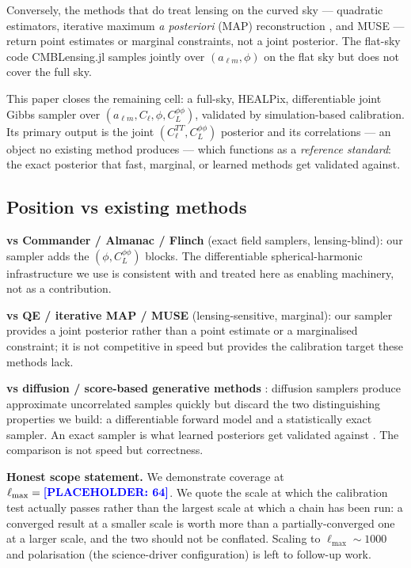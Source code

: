 \documentclass[twocolumn,superscriptaddress,aps,prl,floatfix]{revtex4-2}
\newcommand{\alm}{a_{\ell m}}
\newcommand{\cl}{C_\ell}
\newcommand{\clpp}{C_L^{\phi\phi}}
\newcommand{\lmax}{\ell_{\max}}
\newcommand{\placeholder}[1]{\textcolor{blue}{\textbf{[PLACEHOLDER: #1]}}}
\begin{document}
Conversely, the methods that do treat lensing on the curved sky — quadratic
estimators, iterative maximum \textit{a posteriori} (MAP) reconstruction
\citep{Carron:2017}, and MUSE \citep{MUSE} — return point estimates or marginal
constraints, not a joint posterior.
The flat-sky code CMBLensing.jl \citep{CMBLensing} samples jointly over
$(\alm, \phi)$ on the flat sky but does not cover the full sky.

This paper closes the remaining cell: a full-sky, HEALPix, differentiable joint
Gibbs sampler over $(\alm, \cl, \phi, \clpp)$, validated by
simulation-based calibration.
Its primary output is the joint $(\cl^{TT}, \clpp)$ posterior and its
correlations — an object no existing method produces — which functions as a
\textit{reference standard}: the exact posterior that fast, marginal, or learned
methods \citep{Doeser:2024} get validated against.

\subsection*{Position vs existing methods}

\textbf{vs Commander / Almanac / Flinch} (exact field samplers, lensing-blind):
our sampler adds the $(\phi, \clpp)$ blocks.
The differentiable spherical-harmonic infrastructure we use is consistent with
\citet{Flinch} and treated here as enabling machinery, not as a contribution.

\textbf{vs QE / iterative MAP / MUSE} (lensing-sensitive, marginal):
our sampler provides a joint posterior rather than a point estimate or a
marginalised constraint; it is not competitive in speed but provides
the calibration target these methods lack.

\textbf{vs diffusion / score-based generative methods} \citep{Drouin:2023}:
diffusion samplers produce approximate uncorrelated samples quickly but discard
the two distinguishing properties we build: a differentiable forward model and
a statistically exact sampler.
An exact sampler is what learned posteriors get validated against
\citep{Doeser:2024}.
The comparison is not speed but correctness.

\textbf{Honest scope statement.}
We demonstrate coverage at $\lmax = \placeholder{64}$. We quote the scale at
which the calibration test actually passes rather than the largest scale at
which a chain has been run: a converged result at a smaller scale is worth more
than a partially-converged one at a larger scale, and the two should not be
conflated.
Scaling to $\lmax \sim 1000$ and polarisation (the science-driver configuration)
is left to follow-up work.
\end{document}
